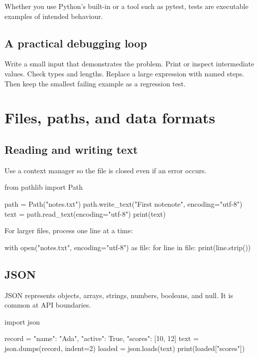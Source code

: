 \documentclass[11pt,openany,oneside]{book}
\newcommand{\inlinecode}[1]{\texttt{\small\detokenize{#1}}}
\begin{document}
Whether you use Python's built-in \inlinecode{unittest} or a tool such as pytest, tests are executable examples of intended behaviour.

\section{A practical debugging loop}

Write a small input that demonstrates the problem. Print or inspect intermediate values. Check types and lengths. Replace a large expression with named steps. Then keep the smallest failing example as a regression test.

\chapter{Files, paths, and data formats}

\section{Reading and writing text}

Use a context manager so the file is closed even if an error occurs.

\begin{code}[language=Python]
from pathlib import Path

path = Path("notes.txt")
path.write_text("First note\nSecond note\n", encoding="utf-8")
text = path.read_text(encoding="utf-8")
print(text)
\end{code}

For larger files, process one line at a time:

\begin{code}[language=Python]
with open("notes.txt", encoding="utf-8") as file:
    for line in file:
        print(line.strip())
\end{code}

\section{JSON}

JSON represents objects, arrays, strings, numbers, booleans, and null. It is common at API boundaries.

\begin{code}[language=Python]
import json

record = {"name": "Ada", "active": True, "scores": [10, 12]}
text = json.dumps(record, indent=2)
loaded = json.loads(text)
print(loaded["scores"])
\end{code}
\end{document}
